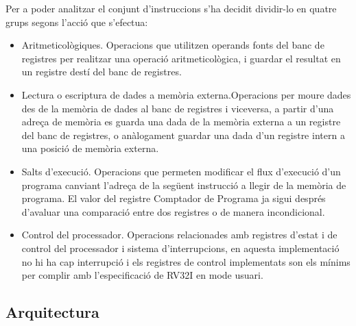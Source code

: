 \documentclass[10pt,a4paper,twocolumn,twoside]{article}
\begin{document}
    Per a poder analitzar el conjunt d'instruccions s'ha decidit dividir-lo en quatre grups segons l'acció que s'efectua:
    
    \begin{itemize}
        \item Aritmeticològiques. Operacions que utilitzen operands fonts del banc de registres per realitzar una operació aritmeticològica, i guardar el resultat en un registre destí del banc de registres.
        \item Lectura o escriptura de dades a memòria externa.Operacions per moure dades des de la memòria de dades al banc de registres i viceversa, a partir d'una adreça de memòria es guarda una dada de la memòria externa a un registre del banc de registres, o anàlogament guardar una dada d'un registre intern a una posició de memòria externa.
        \item Salts d'execució. Operacions que permeten modificar el flux d’execució d’un programa canviant l’adreça de la següent instrucció a llegir de la memòria de programa.  El valor del registre Comptador de Programa ja sigui després d'avaluar una comparació entre dos registres o de manera incondicional.
        \item Control del processador. Operacions relacionades amb registres d'estat i de control del processador i sistema d'interrupcions, en aquesta implementació no hi ha cap interrupció i els registres de control implementats son els mínims per complir amb l'especificació de RV32I en mode usuari.
    \end{itemize}
        
        
    
    \subsection{Arquitectura}
    
\end{document}
